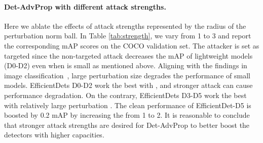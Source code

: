 \documentclass[final]{cvpr}
\begin{document}
\paragraph{Det-AdvProp with different attack strengths.}
Here we ablate the effects of attack strengths represented by the radius  of the perturbation norm ball.
In Table \ref{tab:strength}, we vary  from 1 to 3 and report the corresponding mAP scores on the COCO validation set.
The attacker is set as targeted since the non-targeted attack decreases the mAP of lightweight models (D0-D2) even when  is small as mentioned above.
Aligning with the findings in image classification~\cite{xie2020advprop}, large perturbation size degrades the performance of small models.
EfficientDets D0-D2 work the best with , and stronger attack can cause performance degradation.
On the contrary, EfficientDets D3-D5 work the best with relatively large perturbation .
The clean performance of EfficientDet-D5 is boosted by 0.2 mAP by increasing the  from 1 to 2.
It is reasonable to conclude that stronger attack strengths are desired for Det-AdvProp to better boost the detectors with higher capacities.

\begin{table}[!htb]
\vspace{-3pt}
\centering
{}
\smallskip
\caption{Impact of attack strengths. All attacks are conducted in the targeted manner.  means vanilla training. Larger attack strengths work better with larger model capacities.}
\vspace{-20pt}
\label{tab:strength}
\end{table}
\end{document}
